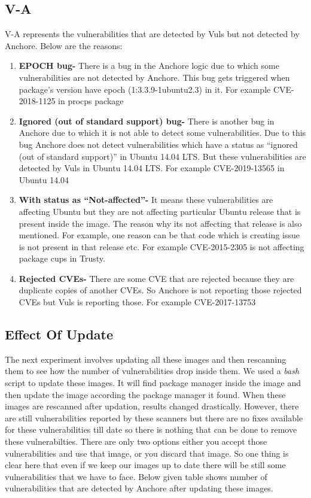 \documentclass[a4paper,num-refs]{oup-contemporary}
\begin{document}
\subsection{V-A}
V-A represents the vulnerabilities that are detected by Vuls but not detected by Anchore. Below are the reasons:
\begin{enumerate}
\item\textbf{EPOCH bug-} There is a bug in the Anchore logic due to which some vulnerabilities are not detected 
	by Anchore. This bug gets triggered when package’s version have epoch (1:3.3.9-1ubuntu2.3)  in it. 
		For example CVE-2018-1125 in procps package
\item\textbf{Ignored (out of standard support) bug-} There is another bug in Anchore due to which it is not 
	able to detect some vulnerabilities. Due to this bug Anchore does not detect vulnerabilities which 
		have a status as “ignored (out of standard support)” in Ubuntu 14.04 LTS. But these vulnerabilities 
		are detected by Vuls in Ubuntu 14.04 LTS. For example CVE-2019-13565 in Ubuntu 14.04
\item\textbf{With status as “Not-affected”-}  It means these vulnerabilities are affecting Ubuntu but they are not 
	affecting particular Ubuntu release that is present inside the image. The reason why its not affecting that 
		release is also mentioned. For example, one reason can be that code which is creating issue is not 
		present in that release etc. For example CVE-2015-2305 is not affecting package cups in Trusty.
\item\textbf{Rejected CVEs-} There are some CVE that are rejected because they are duplicate copies of another CVEs. 
	So Anchore is not reporting those rejected CVEs but Vuls is reporting those. For example CVE-2017-13753
	\end{enumerate}

\subsection{Effect Of Update}

The next experiment involves updating all these images and then rescanning them to see how the number of
vulnerabilities drop inside them. We used a \textit{bash} script to update these images. It will find
package manager inside the image and then update the image according the package manager it found.
When these images are rescanned after updation, results changed drastically. However, there are still
vulnerabilities reported by these scanners but there are no fixes available for these vulnerabilities
till date so there is nothing that can be done to remove these vulnerabilties. There are only two
options either you accept those vulnerabilities and use that image, or you discard that image.
So one thing is clear here that even if we keep our images up to date there will be still some
vulnerabilities that we have to face.
Below given table shows number of vulnerabilities that are detected by Anchore after updating these images.
\end{document}
